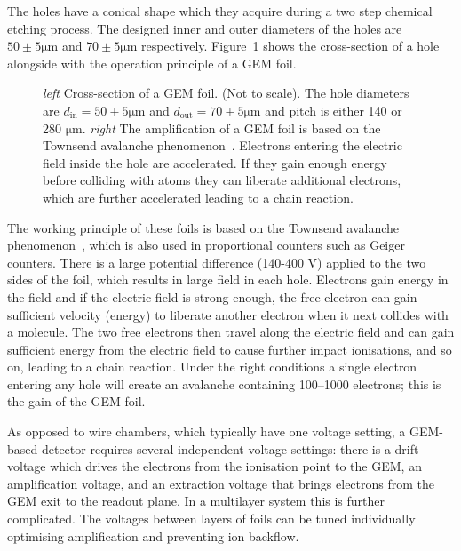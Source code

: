 The holes have a conical shape which they acquire during a two step chemical etching process. The designed inner and outer diameters of the holes are $50\pm5 \mathrm{\mu m}$ and $70 \pm 5 \mathrm{\mu m}$ respectively. Figure~\ref{fig:gem} shows the cross-section of a hole alongside with the operation principle of a GEM foil.

\begin{figure}[htb]
\centering

\caption{{\it left} Cross-section of a GEM foil. (Not to scale). The hole diameters are $d_\mathrm{in} = 50\pm5 \mathrm{\mu m}$ and $d_\mathrm{out} =70 \pm 5 \mathrm{\mu m}$ and pitch is either 140 or 280 $\mathrm{\mu m}$. {\it right} The amplification of a GEM foil is based on the Townsend avalanche phenomenon~\cite{Little1956}. Electrons entering the electric field inside the hole are accelerated. If they gain enough energy before colliding with atoms they can liberate additional electrons, which are further accelerated leading to a chain reaction.}
\label{fig:gem}
\end{figure}

The working principle of these foils is based on the Townsend avalanche phenomenon~\cite{Little1956}, which is also used in proportional counters such as Geiger counters. There is a large potential difference (140-400 V) applied to the two sides of the foil, which results in large field in each hole. Electrons gain energy in the field and if the electric field is strong enough, the free electron can gain sufficient velocity (energy) to liberate another electron when it next collides with a molecule. The two free electrons then travel along the electric field and can gain sufficient energy from the electric field to cause further impact ionisations, and so on, leading to a chain reaction. Under the right conditions a single electron entering any hole will create an avalanche containing 100–1000 electrons; this is the gain of the GEM foil. 

As opposed to wire chambers, which typically have one voltage setting, a GEM-based detector requires several independent voltage settings: there is a drift voltage which drives the electrons from the ionisation point to the GEM, an amplification voltage, and an extraction voltage that brings electrons from the GEM exit to the readout plane. In a multilayer system this is further complicated. The voltages between layers of foils can be tuned individually optimising amplification and preventing ion backflow.



